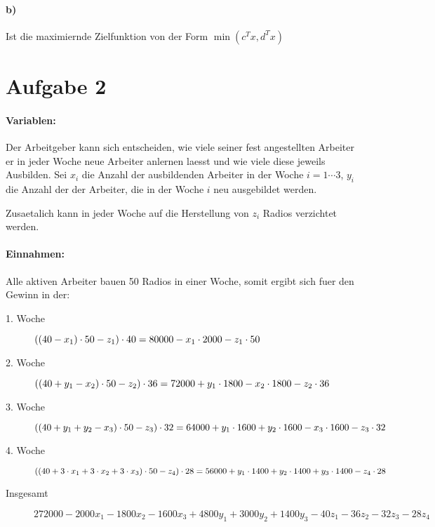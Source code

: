 \paragraph{b)}
Ist die maximiernde Zielfunktion von der Form $\min(c^T x, d^T x)$

\section*{Aufgabe 2}
\paragraph{Variablen:}
Der Arbeitgeber kann sich entscheiden, wie viele seiner fest angestellten Arbeiter er 
in jeder Woche neue Arbeiter anlernen laesst und wie viele diese jeweils Ausbilden. 
Sei $x_i$ die Anzahl der ausbildenden Arbeiter in der Woche $i=1 \cdots 3$, 
    $y_i$ die Anzahl der der Arbeiter, die in der Woche $i$ neu ausgebildet werden.

Zusaetalich kann in jeder Woche auf die Herstellung von $z_i$ Radios verzichtet werden.

\paragraph{Einnahmen:}
Alle aktiven Arbeiter bauen 50 Radios in einer Woche, somit ergibt sich fuer den Gewinn in der:
\begin{description}
\item[1. Woche] $((40 - x_1) \cdot 50 - z_1) \cdot 40 \\= 
    80000 - x_1 \cdot 2000 - z_1 \cdot 50 $
\item[2. Woche] $((40 + y_1 - x_2) \cdot 50 - z_2) \cdot 36 \\= 
    72000 + y_1 \cdot 1800 - x_2 \cdot 1800 - z_2 \cdot 36$
\item[3. Woche] $((40 + y_1 + y_2 - x_3) \cdot 50 - z_3) \cdot 32 \\= 
    64000 + y_1 \cdot 1600 + y_2 \cdot 1600 - x_3 \cdot 1600 - z_3 \cdot 32$
\item[4. Woche] $((40 + 3\cdot x_1 + 3\cdot x_2 + 3\cdot x_3) \cdot 50 - z_4) \cdot 28 \\= 
    56000 + y_1 \cdot 1400 + y_2 \cdot 1400 + y_3 \cdot 1400 - z_4 \cdot 28$
\item[Insgesamt]
    $272000 - 2000 x_1 - 1800 x_2 - 1600 x_3 + 4800 y_1 + 3000 y_2 + 1400 y_3
     - 40 z_1 - 36 z_2 - 32 z_3 - 28 z_4$
\end{description}

